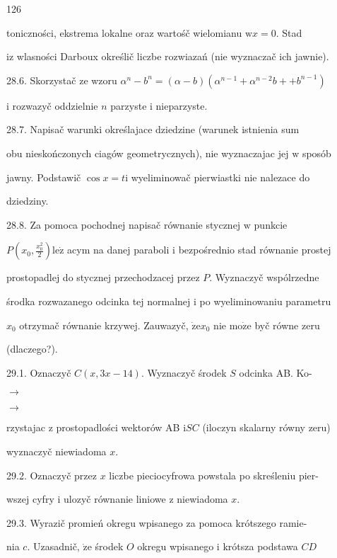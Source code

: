 \documentclass[a4paper,12pt]{article}
\begin{document}
126

toniczności, ekstrema lokalne oraz wartośč wielomianu $\mathrm{w} x = 0$. Stad

$\mathrm{i}\mathrm{z}$ wlasności Darboux określič liczbe rozwiazań (nie wyznaczač ich jawnie).

28.6. Skorzystač ze wzoru $\alpha^{n}-b^{n}=(\alpha-b)(\alpha^{n-1}+\alpha^{n-2}b++b^{n-1})$

$\mathrm{i}$ rozwazyč oddzielnie $n$ parzyste $\mathrm{i}$ nieparzyste.

28.7. Napisač warunki określajace dziedzine (warunek istnienia sum

obu nieskończonych ciagów geometrycznych), nie wyznaczajac jej $\mathrm{w}$ sposób

jawny. Podstawič $\cos x = t \mathrm{i}$ wyeliminowač pierwiastki nie nalezace do

dziedziny.

28.8. Za pomoca pochodnej napisač równanie stycznej $\mathrm{w}$ punkcie

$P(x_{0},\displaystyle \frac{x_{0}^{2}}{2}) \mathrm{l}\mathrm{e}\dot{\mathrm{z}}$ acym na danej paraboli $\mathrm{i}$ bezpośrednio stad równanie prostej

prostopadlej do stycznej przechodzacej przez $P$. Wyznaczyč wspólrzedne

środka rozwazanego odcinka tej normalnej $\mathrm{i}$ po wyeliminowaniu parametru

$x_{0}$ otrzymač równanie krzywej. Zauwazyč, $\dot{\mathrm{z}}\mathrm{e}x_{0}$ nie $\mathrm{m}\mathrm{o}\dot{\mathrm{z}}\mathrm{e}$ byč równe zeru

(dlaczego?).

29.1. Oznaczyč $C(x,3x-14)$. Wyznaczyč środek $S$ odcinka AB. Ko-

$\rightarrow$

$\rightarrow$

rzystajac $\mathrm{z}$ prostopadlości wektorów AB $\mathrm{i}SC$ (iloczyn skalarny równy zeru)

wyznaczyč niewiadoma $x.$

29.2. Oznaczyč przez $x$ liczbe pieciocyfrowa powstala po skreśleniu pier-

wszej cyfry $\mathrm{i}$ ulozyč równanie liniowe $\mathrm{z}$ niewiadoma $x.$

29.3. Wyrazič promień okregu wpisanego za pomoca krótszego ramie-

nia $c$. Uzasadnič, $\dot{\mathrm{z}}\mathrm{e}$ środek $O$ okregu wpisanego $\mathrm{i}$ krótsza podstawa $CD$
\end{document}

